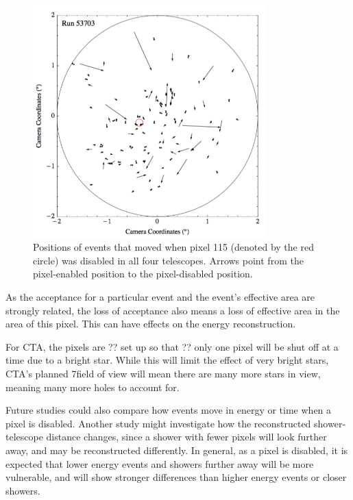 \begin{figure}[ht]
  \begin{center}
    \includegraphics[width=0.8\textwidth]{images/disabled_pixel/moving_events}
    \caption[Event Movement]{Positions of events that moved when pixel 115 (denoted by the red circle) was disabled in all four telescopes.  Arrows point from the pixel-enabled position to the pixel-disabled position.}\label{fig:dpix_move}
  \end{center}
\end{figure}

As the acceptance for a particular event and the event's effective area are strongly related, the loss of acceptance also means a loss of effective area in the area of this pixel.
This can have effects on the energy reconstruction.

For CTA, the pixels are ?? set up so that ?? only one pixel will be shut off at a time due to a bright star.
While this will limit the effect of very bright stars, CTA's planned 7\degree field of view will mean there are many more stars in view, meaning many more holes to account for.

Future studies could also compare how events move in energy or time when a pixel is disabled.
Another study might investigate how the reconstructed shower-telescope distance changes, since a shower with fewer pixels will look further away, and may be reconstructed differently.
In general, as a pixel is disabled, it is expected that lower energy events and showers further away will be more vulnerable, and will show stronger differences than higher energy events or closer showers.


